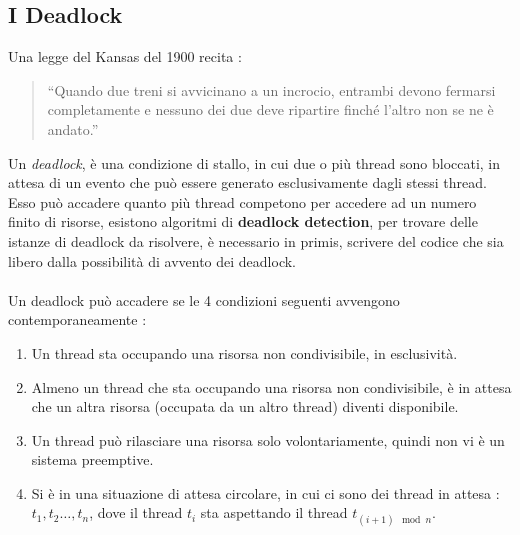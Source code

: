 \documentclass[12pt, letterpaper]{article}
\newcommand{\acc}{\\\hphantom{}\\}
\begin{document}
\subsection{I Deadlock}
Una legge del Kansas del 1900 recita : \begin{quote}
    “Quando due treni si avvicinano a un incrocio, entrambi devono fermarsi completamente e
     nessuno dei due deve ripartire finché l’altro non se ne è andato.”
\end{quote}
Un \textit{deadlock}, è una condizione di stallo, in cui due o più thread sono bloccati, in attesa di un 
evento che può essere generato esclusivamente dagli stessi thread. Esso può accadere quanto più thread competono 
per accedere ad un numero finito di risorse, esistono algoritmi di \textbf{deadlock detection}, per trovare delle 
istanze di deadlock da risolvere, è necessario in primis, scrivere del codice che sia libero dalla possibilità di 
avvento dei deadlock. \acc Un deadlock può accadere se le 4 condizioni seguenti avvengono contemporaneamente : \begin{enumerate}
    \item Un thread sta occupando una risorsa non condivisibile, in esclusività.
    \item Almeno un thread che sta occupando una risorsa non condivisibile, è in attesa che un altra risorsa (occupata 
    da un altro thread) diventi disponibile.
    \item Un thread può rilasciare una risorsa solo volontariamente, quindi non vi è un sistema preemptive. 
    \item Si è in una situazione di attesa circolare, in cui ci sono dei thread in attesa : \(t_1,t_2\dots,t_n\), dove 
    il thread \(t_i\) sta aspettando il thread \(t_{(i+1)\mod n}\).
\end{enumerate}
\end{document}
